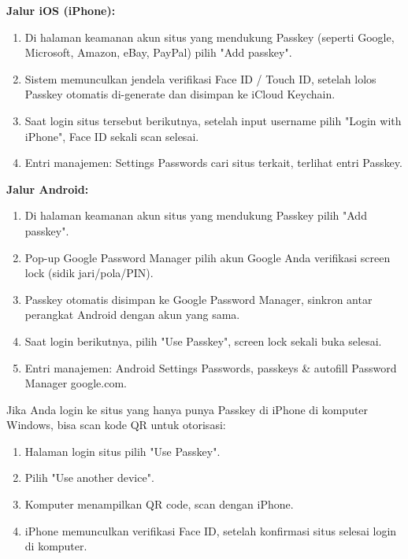 
\textbf{Jalur iOS (iPhone):}

\begin{enumerate}
  \item Di halaman keamanan akun situs yang mendukung Passkey (seperti Google, Microsoft, Amazon, eBay, PayPal) pilih "Add passkey".
  \item Sistem memunculkan jendela verifikasi Face ID / Touch ID, setelah lolos Passkey otomatis di-generate dan disimpan ke iCloud Keychain.
  \item Saat login situs tersebut berikutnya, setelah input username pilih "Login with iPhone", Face ID sekali scan selesai.
  \item Entri manajemen: Settings Passwords cari situs terkait, terlihat entri Passkey.
\end{enumerate}

\textbf{Jalur Android:}

\begin{enumerate}
  \item Di halaman keamanan akun situs yang mendukung Passkey pilih "Add passkey".
  \item Pop-up Google Password Manager pilih akun Google Anda verifikasi screen lock (sidik jari/pola/PIN).
  \item Passkey otomatis disimpan ke Google Password Manager, sinkron antar perangkat Android dengan akun yang sama.
  \item Saat login berikutnya, pilih "Use Passkey", screen lock sekali buka selesai.
  \item Entri manajemen: Android Settings Passwords, passkeys \& autofill Password Manager google.com.
\end{enumerate}


Jika Anda login ke situs yang hanya punya Passkey di iPhone di komputer Windows, bisa scan kode QR untuk otorisasi:

\begin{enumerate}
  \item Halaman login situs pilih "Use Passkey".
  \item Pilih "Use another device".
  \item Komputer menampilkan QR code, scan dengan iPhone.
  \item iPhone memunculkan verifikasi Face ID, setelah konfirmasi situs selesai login di komputer.
\end{enumerate}

